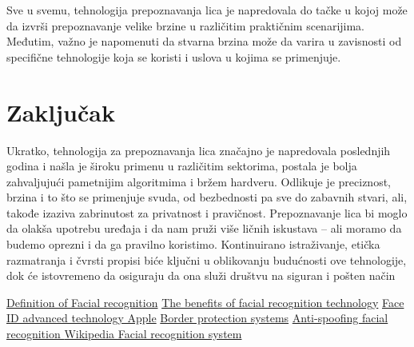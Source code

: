 \documentclass[a4paper]{article}
\begin{document}
Sve u svemu, tehnologija prepoznavanja lica je napredovala do tačke u kojoj može da izvrši prepoznavanje velike brzine u različitim praktičnim scenarijima. Međutim, važno je napomenuti da stvarna brzina može da varira u zavisnosti od specifične tehnologije koja se koristi i uslova u kojima se primenjuje.\cite{ht208108235}


\section{Zaključak}
\label{sec: zaključak }
Ukratko, tehnologija za prepoznavanja lica značajno je napredovala poslednjih godina i našla je široku primenu u različitim sektorima, postala je bolja zahvaljujući pametnijim algoritmima i bržem hardveru. Odlikuje je preciznost, brzina i to što se primenjuje svuda, od bezbednosti pa sve do zabavnih stvari, ali, takođe izaziva zabrinutost za privatnost i pravičnost. Prepoznavanje lica bi moglo da olakša upotrebu uređaja i da nam pruži više ličnih iskustava – ali moramo da budemo oprezni i da ga pravilno koristimo. Kontinuirano istraživanje, etička razmatranja i čvrsti propisi biće ključni u oblikovanju budućnosti ove tehnologije, dok će istovremeno da osiguraju da ona služi društvu na siguran i pošten način



\appendix

\begin{thebibliography}{6}

 \href{https://www.techtarget.com/searchenterpriseai/definition/facial-recognition}{Definition of Facial recognition}
 \href{https://aws.amazon.com/what-is/facial-recognition/#:~:text=taken%20years%20earlier.-,Is%20facial%20recognition%20safe%3F,identification%20methods%20in%20biometric%20technology}{The benefits of facial recognition technology}
 \href{https://support.apple.com/en-us/HT208108 }{Face ID advanced technology Apple}
 \href{https://www.biometricupdate.com/202003/seeing-is-identifying-new-border-protection-systems-train-how-to-spot-impostors }{Border protection systems}
 \href{https://www.idnow.io/blog/fraud-detection-anti-spoofing-facial-recognition/ }{Anti-spoofing facial recognition }
 \href{https://en.wikipedia.org/wiki/Facial_recognition_system }{Wikipedia Facial recognition system}



\end{thebibliography}
\end{document}
